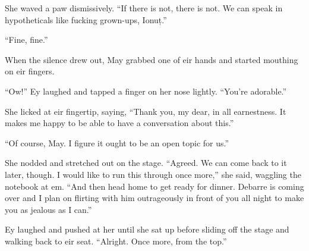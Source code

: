She waved a paw dismissively. ``If there is not, there is not. We can speak in hypotheticals like fucking grown-ups, Ionuț.''

``Fine, fine.''

When the silence drew out, May grabbed one of eir hands and started mouthing on eir fingers.

``Ow!'' Ey laughed and tapped a finger on her nose lightly. ``You're adorable.''

She licked at eir fingertip, saying, ``Thank you, my dear, in all earnestness. It makes me happy to be able to have a conversation about this.''

``Of course, May. I figure it ought to be an open topic for us.''

She nodded and stretched out on the stage. ``Agreed. We can come back to it later, though. I would like to run this through once more,'' she said, waggling the notebook at em. ``And then head home to get ready for dinner. Debarre is coming over and I plan on flirting with him outrageously in front of you all night to make you as jealous as I can.''

Ey laughed and pushed at her until she sat up before sliding off the stage and walking back to eir seat. ``Alright. Once more, from the top.''

